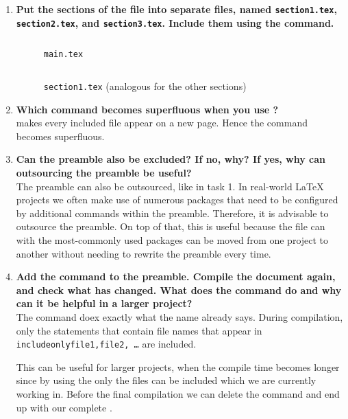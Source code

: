 \begin{enumerate}
  \item 
       \textbf{Put the sections of the file into separate files, named 
    	\texttt{section1.tex}, \texttt{section2.tex}, and 
    	\texttt{section3.tex}. 
    	Include them using the  \texttt{} command.}
    \begin{figure}[H]
      \inputminted[linenos=true]{latex}{exercises/project-structure/main-with-preamble.done.tex}
      \caption{\texttt{main.tex}}
    \end{figure}
    \begin{figure}[H]
      \inputminted[linenos=true,breaklines=true]{latex}{exercises/project-structure/section1.done.tex}
      \caption{\texttt{section1.tex} (analogous for the other 
      sections)}
  \end{figure}
    \item \textbf{Which command becomes superfluous when you use 
  	\texttt{}?} \\
  	\texttt{} makes every included file appear on a new 
  	page. Hence the command \texttt{\newpage} becomes superfluous.
  \item 
    \textbf{Can the preamble also be excluded? If no, why? If yes, why can 
    	outsourcing the preamble be useful?} \\
    The preamble can also be outsourced, like in task 1. In real-world \LaTeX{} 
    projects we often make use of numerous packages that need to be configured 
    by additional commands within the preamble. Therefore, it is advisable to 
    outsource the preamble. On top of that, this is useful because the file can 
    with the most-commonly used packages can be moved from one project to 
    another without needing to rewrite the preamble every time.
  \item 
    \textbf{Add the command \texttt{} to the 
    preamble. Compile the document again, and check what has changed. What does 
    the command do and why can it be helpful in a larger project? } \\
	The command \texttt{} doex exactly what 
	the name already says. During compilation, only the 
	\texttt{} 
	statements that contain file names that appear in 
	\texttt{includeonly{file1,file2, …}} are included.
	
	This can be useful for larger projects, when the compile time becomes 
	longer since by using the \texttt{} only the files 
	can be included which we are currently working in. Before the final 
	compilation we can delete the \texttt{} command and 
	end up with our complete .
    
\end{enumerate}